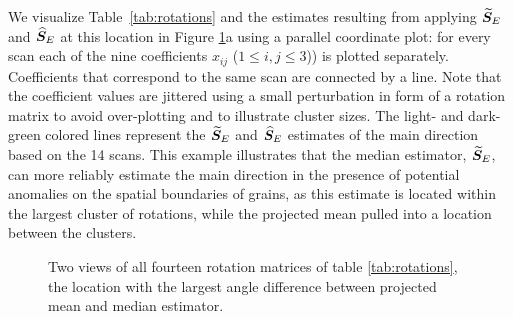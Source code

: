 We visualize Table~\ref{tab:rotations} and the estimates resulting from applying ${\widetilde{\bm S}_E}$ and ${\widehat{\bm S}_E}$ at this location in Figure \ref{fig:pcp}a using a parallel coordinate plot: for every scan each of the nine coefficients $x_{ij}$ ($1 \le i,j \le 3$)) is plotted separately. Coefficients that correspond to the same scan are connected by a line.   Note that the coefficient values are jittered using a small perturbation in form of a rotation matrix to avoid over-plotting and to illustrate cluster sizes. The light- and dark- green colored lines represent the ${\widetilde{\bm S}_E}$ and ${\widehat{\bm S}_E}$ estimates of the main direction based on the 14 scans.   This example  illustrates that the median estimator, ${\widetilde{\bm S}_E}$,  can more reliably estimate the main direction in the presence of potential anomalies on the spatial boundaries of grains, as this estimate is located within the largest cluster of rotations, while the projected mean pulled into a location between the clusters.



\begin{figure}[htbp] %
   \centering
   
   \caption{ \label{fig:pcp} Two views of all fourteen rotation matrices of table \ref{tab:rotations}, the location with the largest angle difference between projected mean and median estimator.}
\end{figure}

